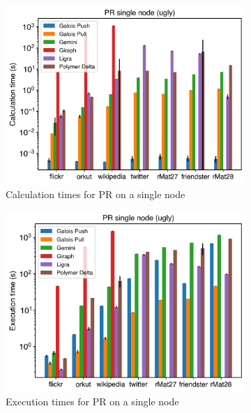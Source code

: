 \begin{figure}
	\begin{subfigure}{0.3\textwidth}
		\includegraphics[width=\linewidth]{../../plots/singleNodePR_calcTime.png}
		\caption{Calculation times for PR on a single node}
		\label{fig:singleNodePR_calc}
	\end{subfigure}
	\hfil
	\begin{subfigure}{0.3\textwidth}
		\includegraphics[width=\linewidth]{../../plots/singleNodePR_execTime.png}
		\caption{Execution times for PR on a single node}
		\label{fig:singleNodePR_exec}
	\end{subfigure}
	\hfil
	\begin{subfigure}{0.3\textwidth}

\end{subfigure}
\end{figure}
